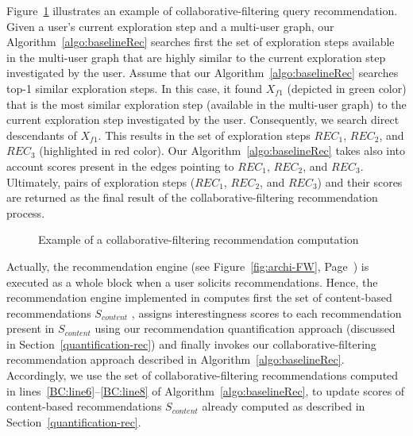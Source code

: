\begin{example}
\label{ex:collabRec}
Figure~\ref{fig:exCollabRec} illustrates an example of collaborative-filtering query recommendation.  
Given a user's current exploration step and a multi-user graph, our Algorithm~\ref{algo:baselineRec} searches first the set of exploration steps available in the multi-user graph that are highly similar to the current exploration step investigated by the user.
Assume that our Algorithm~\ref{algo:baselineRec} searches top-1 similar exploration steps. 
In this case, it found $X_{f1}$ (depicted in green color) that is the most similar exploration step (available in the multi-user graph) to the current exploration step investigated by the user.
Consequently, we search direct descendants of $X_{f1}$. This results in the set of exploration steps $REC_1$, $REC_2$, and $REC_3$ (highlighted in red color). Our Algorithm~\ref{algo:baselineRec} takes also into account scores present in the edges pointing to $REC_1$, $REC_2$, and $REC_3$. 
Ultimately, pairs of exploration steps ($REC_1$, $REC_2$, and $REC_3$) and their scores are returned as the final result of the collaborative-filtering recommendation process.
\end{example}
\begin{figure}[t]
\centering
\caption{Example of a collaborative-filtering recommendation computation}
\label{fig:exCollabRec}
\end{figure}    

Actually, the recommendation engine (see Figure~\ref{fig:archi-FW}, Page~\pageref{fig:archi-FW}) is executed as a whole block when a user solicits recommendations.
Hence, the recommendation engine implemented in \prototype{} computes first the set of content-based recommendations $S_{content}$ , assigns interestingness scores to each recommendation present in $S_{content}$ using our recommendation quantification approach (discussed in Section~\ref{quantification-rec}) and finally invokes our collaborative-filtering recommendation approach described in Algorithm~\ref{algo:baselineRec}. 
Accordingly, we use the set of collaborative-filtering recommendations computed in lines~\ref{BC:line6}--\ref{BC:line8} of Algorithm~\ref{algo:baselineRec}, to update scores of content-based recommendations $S_{content}$ already computed as described in Section~\ref{quantification-rec}. 





